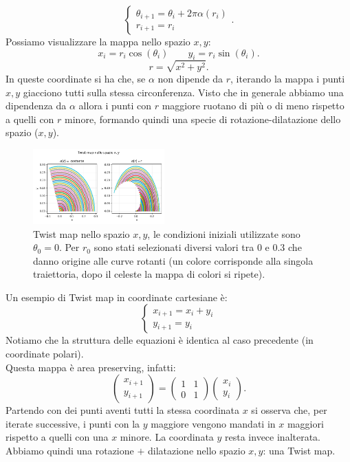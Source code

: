 \begin{exmp}
    \[
        \begin{cases}
	    \theta_{i+1} = \theta_i + 2\pi\alpha (r_i)\\
	    r_{i+1}=r_i
        \end{cases}
    .\] 
    Possiamo visualizzare la mappa nello spazio $x, y$:
    \[
	x_i = r_i\cos (\theta_i) \qquad y_i = r_i\sin (\theta_i)
    .\] 
    \[
        r = \sqrt{x^2+y^2} 
    .\] 
    In queste coordinate si ha che, se $\alpha$ non dipende da $r$, iterando la mappa i punti $x, y$ giacciono tutti sulla stessa circonferenza.
    Visto che in generale abbiamo una dipendenza da $\alpha$ allora i punti con $r$ maggiore ruotano di più o di meno rispetto a quelli con $r$ minore, formando quindi una specie di rotazione-dilatazione dello spazio ($x, y$).
    \begin{figure}[H]
        \centering
	\includegraphics[width=0.45\textwidth]{figures/18_twist_tetha_r.png}
	\caption{\scriptsize Twist map nello spazio $x, y$, le condizioni iniziali utilizzate sono $\theta_0 = 0$. Per $r_0$ sono stati selezionati diversi valori tra $0$ e $0.3$ che danno origine alle curve rotanti (un colore corrisponde alla singola traiettoria, dopo il celeste la mappa di colori si ripete).}
        \label{fig:-figures-18_twist_tetha_r-png}
    \end{figure}
\end{exmp}
\noindent
\begin{exmp}
    Un esempio di Twist map in coordinate cartesiane è:
    \[
        \begin{cases}
            x_{i+1}=x_i+y_i\\
	    y_{i+1}=y_i
        \end{cases}
    \] 
    Notiamo che la struttura delle equazioni è identica al caso precedente (in coordinate polari).\\
    Questa mappa è area preserving, infatti:
    \[
        \begin{pmatrix} x_{i+1} \\ y_{i+1} \end{pmatrix} =
	\begin{pmatrix} 
	    1 & 1 \\
	    0 & 1
	\end{pmatrix} 
	\begin{pmatrix} x_i \\ y_i \end{pmatrix} 
    .\] 
    Partendo con dei punti aventi tutti la stessa coordinata $x$ si osserva che, per iterate successive, i punti con la $y$ maggiore vengono mandati in $x$ maggiori rispetto a quelli con una $x$ minore. La coordinata $y$ resta invece inalterata.\\
    Abbiamo quindi una rotazione $+$ dilatazione nello spazio $x,y$: una Twist map.
\end{exmp}
